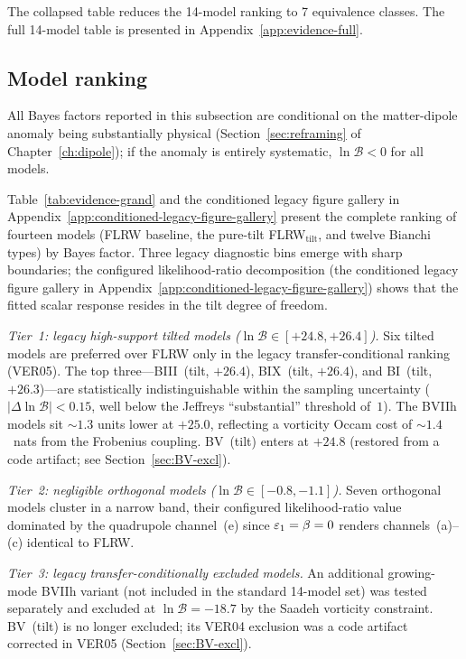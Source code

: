 \noindent
The collapsed table reduces the 14-model ranking to 7
equivalence classes.  The full 14-model table is presented
in Appendix~\ref{app:evidence-full}.


\subsection{Model ranking}\label{sec:evidence-ranking}

All Bayes factors reported in this subsection are conditional on
the matter-dipole anomaly being substantially physical
(Section~\ref{sec:reframing} of Chapter~\ref{ch:dipole}); if the
anomaly is entirely systematic, $\ln\mathcal{B} < 0$ for all
models.

Table~\ref{tab:evidence-grand} and
the conditioned legacy figure gallery in Appendix~\ref{app:conditioned-legacy-figure-gallery} present the complete ranking
of fourteen models (FLRW baseline, the pure-tilt
FLRW$_{\mathrm{tilt}}$, and twelve Bianchi types) by Bayes
factor.  Three
legacy diagnostic bins emerge with sharp boundaries; the configured
likelihood-ratio decomposition (the conditioned legacy figure gallery
in Appendix~\ref{app:conditioned-legacy-figure-gallery}) shows
that the fitted scalar response resides in the tilt degree of freedom.

\emph{Tier~1: legacy high-support tilted models
($\ln\mathcal{B} \in [+24.8, +26.4]$).}
Six tilted models are preferred over FLRW only in the legacy
transfer-conditional ranking (VER05).  The
top three---BIII~(tilt, $+26.4$), BIX~(tilt, $+26.4$), and
BI~(tilt, $+26.3$)---are statistically indistinguishable within
the sampling uncertainty ($|\Delta\ln\mathcal{B}| < 0.15$,
well below the Jeffreys ``substantial'' threshold of~$1$).
The BVIIh models sit $\sim 1.3$ units lower at $+25.0$,
reflecting a vorticity Occam cost of $\sim 1.4$~nats
from the Frobenius coupling.  BV~(tilt) enters at $+24.8$
(restored from a code artifact; see Section~\ref{sec:BV-excl}).

\emph{Tier~2: negligible orthogonal models
($\ln\mathcal{B} \in [-0.8, -1.1]$).}
Seven orthogonal models cluster in a narrow band, their
configured likelihood-ratio value dominated by the quadrupole channel~(e) since
$\varepsilon_1 = \beta = 0$ renders channels~(a)--(c) identical to
FLRW.

\emph{Tier~3: legacy transfer-conditionally excluded models.}
An additional growing-mode BVIIh variant (not included in the
standard 14-model set) was tested separately and excluded at
$\ln\mathcal{B} = -18.7$ by the Saadeh vorticity constraint.
BV~(tilt) is no longer excluded; its VER04 exclusion was a code
artifact corrected in VER05 (Section~\ref{sec:BV-excl}).

